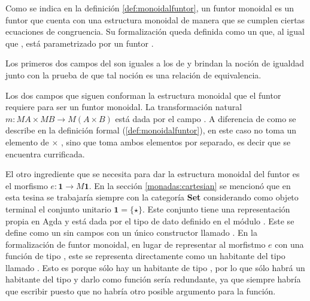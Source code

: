 Como se indica en la definición \ref{def:monoidalfuntor}, un funtor monoidal es un funtor que cuenta con una estructura monoidal de manera que se cumplen ciertas ecuaciones de congruencia. Su formalización queda definida como un  que, al igual que , está parametrizado por un funtor  \AgdaSymbol{:}  \AgdaSymbol{$\rightarrow$} . 


Los primeros dos campos del  son iguales a los de  y brindan la noción de igualdad junto con la prueba de que tal noción es una relación de equivalencia. 

Los dos campos que siguen conforman la estructura monoidal que el funtor requiere para ser un funtor monoidal. La transformación natural $m : \mathit{M} A \times \mathit{M} B \rightarrow \mathit{M} (A \times B)$ está dada por el campo . A diferencia de como se describe en la definición formal (\ref{def:monoidalfuntor}), en este caso  no toma un elemento de  $\times$ , sino que toma ambos elementos por separado, es decir que se encuentra currificada. 

El otro ingrediente que se necesita para dar la estructura monoidal del funtor es el morfismo $e : \mathbf{1} \rightarrow \mathit{M} \mathbf{1}$. En la sección \ref{monadas:cartesian} se mencionó que en esta tesina se trabajaría siempre con la categoría \textbf{Set} considerando como objeto terminal el conjunto unitario $\mathbf{1} = \{\star\}$. Este conjunto tiene una representación propia en Agda y está dada por el tipo de dato \AgdaDatatype{$\top$} definido en el módulo \href{https://agda.github.io/agda-stdlib/Data.Unit.Base.html}{}. Este se define como un  sin campos con un único constructor llamado . En la formalización de funtor monoidal, en lugar de representar al morfistmo $e$ con una función de tipo \AgdaDatatype{$\top$} \AgdaSymbol{$\rightarrow$}  \AgdaDatatype{$\top$}, este se representa directamente como un habitante del tipo  \AgdaDatatype{$\top$} llamado . Esto es porque sólo hay un habitante de tipo \AgdaDatatype{$\top$}, por lo que sólo habrá un habitante del tipo  \AgdaDatatype{$\top$} y darlo como función sería redundante, ya que siempre habría que escribir   puesto que no habría otro posible argumento para la función.

